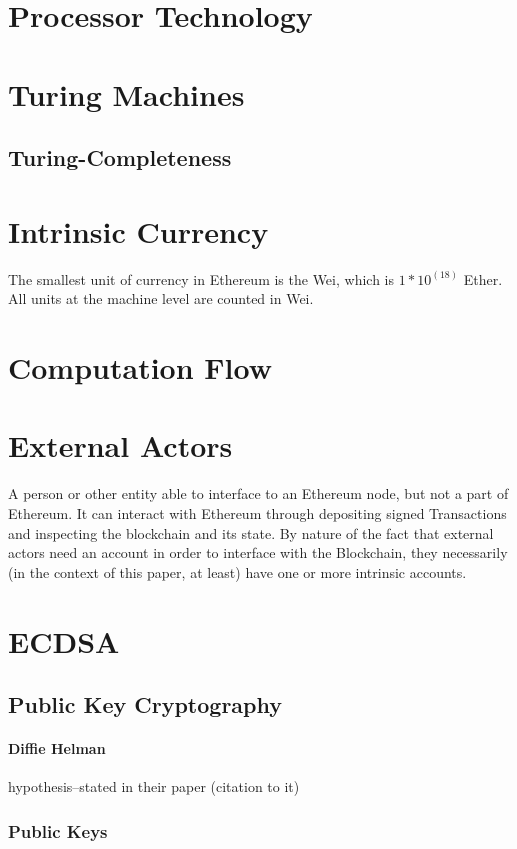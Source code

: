 \documentclass[10pt,a4paper,leqno,bibliography=totoc]{scrartcl}
\newenvironment{alphafootnotes}
{\par\edef\savedfootnotenumber{\number\value{footnote}}
\renewcommand{\thefootnote}{\alph{footnote}}
\setcounter{footnote}{0}}
{\par\setcounter{footnote}{\savedfootnotenumber}}
\begin{document}
\begin{alphafootnotes}
\begin{multicols*}{2}
	\section{Processor Technology}
	\section{Turing Machines}
		\subsection{Turing-Completeness}
	\section{Intrinsic Currency}
		The smallest unit of currency in Ethereum is the Wei, which is $1*10^(18)$ Ether. All units at the machine level are counted in Wei.
	\section{Computation Flow}
	
	\section{External Actors} A person or other entity able to interface to an Ethereum node, but not a part of Ethereum. It can interact with Ethereum through depositing signed Transactions and inspecting the blockchain and its state. By nature of the fact that external actors need an account in order to interface with the Blockchain, they necessarily (in the context of this paper, at least) have one or more intrinsic accounts.

	\section{ECDSA}

		\subsection{Public Key Cryptography}
				\paragraph{Diffie Helman} hypothesis--stated in their paper (citation to it)
			\subsubsection{Public Keys}


\end{multicols*}
\end{alphafootnotes}
\end{document}

